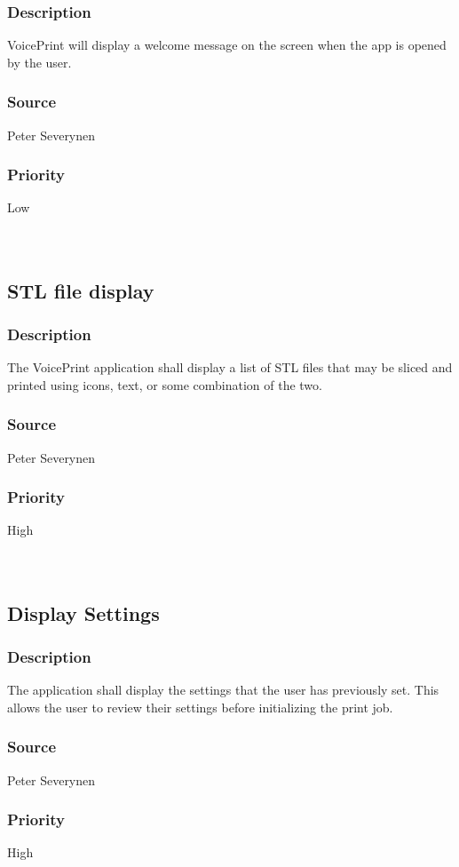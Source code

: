 \subsubsection{Description}
VoicePrint will display a welcome message on the screen when the app is opened by the user.
\subsubsection{Source}
Peter Severynen
\subsubsection{Priority}
Low\\
\\
\\
\subsection{STL file display}
\subsubsection{Description}
The VoicePrint application shall display a list of STL files that may be sliced and printed using icons, text, or some combination of the two.
\subsubsection{Source}
Peter Severynen
\subsubsection{Priority}
High\\
\\
\\
\subsection{Display Settings}
\subsubsection{Description}
The application shall display the settings that the user has previously set. This allows the user to review their settings before initializing the print job.
\subsubsection{Source}
Peter Severynen
\subsubsection{Priority}
High\\
\\
\\
